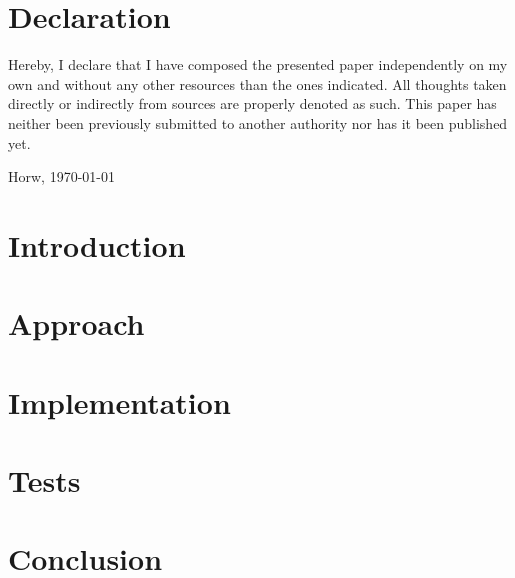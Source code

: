 \documentclass[a4paper, english, 10pt]{report}
\begin{document}
\chapter*{Declaration}
\thispagestyle{empty}
Hereby, I declare that I have composed the presented paper independently on my own and without any other resources than the ones indicated. All thoughts
taken directly or indirectly from sources are properly denoted as such.
This paper has neither been previously submitted to another authority nor has it been published yet.

\vspace{2cm}
Horw, \today

\begin{abstract}

\end{abstract}
\tableofcontents

\chapter{Introduction}
\label{ch:Introduction}


\chapter{Approach}
\label{ch:Approach}


\chapter{Implementation}
\label{ch:Implementation}


\chapter{Tests}
\label{ch:Tests}


\chapter{Conclusion}
\label{ch:Conclusion}




\listoffigures

\listoftables

\begin{appendices}

\end{appendices}
\end{document}
